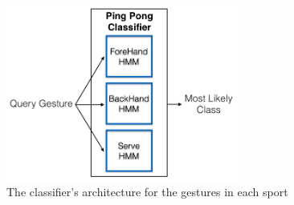 \begin{figure}
\centering
\includegraphics[width=3in]{resources/arch.jpg}
\caption{The classifier’s architecture for the gestures in each sport}
\label{fig-arch}
\end{figure}